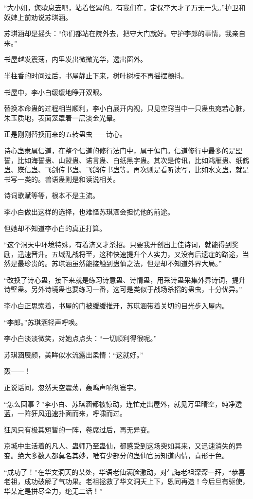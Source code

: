 \begin{this_body}
“大小姐，您歇息去吧，站着怪累的。有我们在，定保李大才子万无一失。”护卫和奴婢上前劝说苏琪涵。

苏琪涵却是摇头：“你们都站在院外去，把守大门就好。守护李郎的事情，我亲自来。”

书屋越发震荡，内里发出微微光华，透出窗外。

半柱香的时间过后，书屋静止下来，树叶树枝不再摇摆颤抖。

书屋中，李小白缓缓地睁开双眼。

替换本命蛊的过程相当顺利，李小白展开内视，只见空窍当中一只蛊虫宛若心脏，朱玉质地，表面笼罩着一层淡金光晕。

正是刚刚替换而来的五转蛊虫——诗心。

诗心蛊隶属信道，在整个信道的修行法门中，属于偏门。信道修行中最多的是盟誓，比如海誓蛊、山盟蛊、诺言蛊、白纸黑字蛊。其次是传讯，比如鸿雁蛊、纸鹤蛊、蝶信蛊、飞剑传书蛊、飞鸽传书蛊等。再次则是看听读写，比如水文蛊，就是书写一类的。兽语蛊则是和读说相关。

诗词歌赋等等，根本不是主流。

李小白做出这样的选择，也难怪苏琪涵会担忧他的前途。

但她却不知道李小白的真正打算。

“这个洞天中环境特殊，有着济文才杀招。只要我开创出上佳诗词，就能得到奖励，迅速晋升。五域乱战将至，这种快速提升个人实力，又没有后遗症的路途，当然是最珍贵的。苏琪涵虽然能接触到蛊仙之法，但是却不知道外界大局。”

“改换了诗心蛊，接下来就是练习诗意蛊、诗情蛊，用采诗蛊采集外界诗词，提升诗壁蛊。另外诗境蛊也要练习一番，这可是类似于战场杀招的蛊虫，十分优异。”

李小白正思索着，书屋的门被缓缓推开，苏琪涵带着关切的目光步入屋内。

“李郎。”苏琪涵轻声呼唤。

李小白淡淡微笑，对她点点头：“一切顺利得很呢。”

苏琪涵展颜，美眸似水流露出柔情：“这就好。”

轰——！

正说话间，忽然天空震荡，轰鸣声响彻寰宇。

“怎么回事？”李小白、苏琪涵都被惊动，连忙走出屋外，就见万里晴空，纯净透蓝，一阵狂风迅速扑面而来，呼啸而过。

狂风只有极其短暂的一阵，卷席过后，再无异变。

京城中生活着的凡人、蛊师乃至蛊仙，都感受到这场突如其来，又迅速消失的异变。绝大多数人都莫名其妙，唯有少部分的蛊仙官员知道内情，喜形于色。

“成功了！”在华文洞天的某处，华语老仙满脸激动，对气海老祖深深一拜，“恭喜老祖，成功破解了气功果。老祖拯救了华文洞天上下，恩同再造！今后旦有驱使，华某定是拼尽全力，绝无二话！”


\end{this_body}
